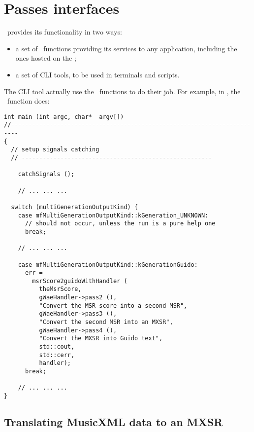 
\chapter{Passes interfaces}

\mf\ provides its functionality in two ways:
\begin{itemize}
\item a set of \API\ functions providing its services to any application, including the ones hosted on the \Web;
\item a set of CLI tools, to be used in terminals and scripts.
\end{itemize}

The CLI tool actually use the \API\ functions to do their job. For example, in {\tt }, the \mainFunction\ function does:
\begin{lstlisting}[language=CPlusPlus]
int main (int argc, char*  argv[])
//------------------------------------------------------------------------
{
  // setup signals catching
  // ------------------------------------------------------

	catchSignals ();

	// ... ... ...

  switch (multiGenerationOutputKind) {
    case mfMultiGenerationOutputKind::kGeneration_UNKNOWN:
      // should not occur, unless the run is a pure help one
      break;

  	// ... ... ...

    case mfMultiGenerationOutputKind::kGenerationGuido:
      err =
        msrScore2guidoWithHandler (
          theMsrScore,
          gWaeHandler->pass2 (),
          "Convert the MSR score into a second MSR",
          gWaeHandler->pass3 (),
          "Convert the second MSR into an MXSR",
          gWaeHandler->pass4 (),
          "Convert the MXSR into Guido text",
          std::cout,
          std::cerr,
          handler);
      break;

	// ... ... ...
}
\end{lstlisting}


\section{Translating MusicXML data to an MXSR}


